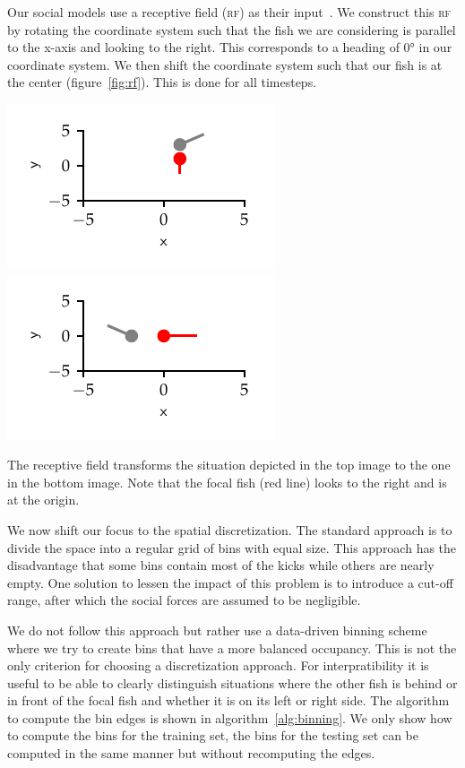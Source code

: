 \documentclass[nobib, a4paper]{tufte-handout}
\begin{document}
Our social models use a receptive field (\textsc{rf}) as their input~\autocite{discreteModes}.
We construct this \textsc{rf} by rotating the coordinate system such that the fish we are considering is parallel to the x-axis and looking to the right.
This corresponds to a heading of \ang{0} in our coordinate system.
We then shift the coordinate system such that our fish is at the center (figure~\ref{fig:rf}).
This is done for all timesteps.

\begin{marginfigure}
 \includegraphics{receptive_field_before} 
 \includegraphics[scale=1]{receptive_field_after} 
 \caption{The receptive field transforms the situation depicted in the top image to the one in the bottom image.
 Note that the focal fish (red line) looks to the right and is at the origin.}
\label{fig:rf}
\end{marginfigure}

We now shift our focus to the spatial discretization.
The standard approach is to divide the space into a regular grid of bins with equal size.
This approach has the disadvantage that some bins contain most of the kicks while others are nearly empty.
One solution to lessen the impact of this problem is to introduce a cut-off range, after which the social forces are assumed to be negligible.

We do not follow this approach but rather use a data-driven binning scheme where we try to create bins that have a more balanced occupancy.
This is not the only criterion for choosing a discretization approach.
For interpratibility it is useful to be able to clearly distinguish situations where the other fish is behind or in front of the focal fish and whether it is on its left or right side.
The algorithm to compute the bin edges is shown in algorithm~\ref{alg:binning}.
We only show how to compute the bins for the training set, the bins for the testing set can be computed in the same manner but without recomputing the edges.
\end{document}
